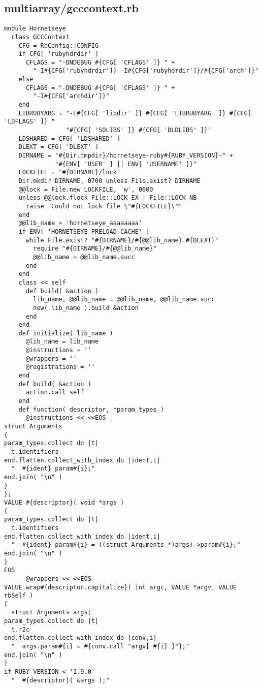\subsection{multiarray/gcccontext.rb}\label{cha:multiarray-gcccontext-rb}
\begin{lstlisting}
module Hornetseye
  class GCCContext
    CFG = RbConfig::CONFIG
    if CFG[ 'rubyhdrdir' ]
      CFLAGS = "-DNDEBUG #{CFG[ 'CFLAGS' ]} " +
        "-I#{CFG['rubyhdrdir']} -I#{CFG['rubyhdrdir']}/#{CFG['arch']}"
    else
      CFLAGS = "-DNDEBUG #{CFG[ 'CFLAGS' ]} " +
        "-I#{CFG['archdir']}"
    end
    LIBRUBYARG = "-L#{CFG[ 'libdir' ]} #{CFG[ 'LIBRUBYARG' ]} #{CFG[ 'LDFLAGS' ]} "
                 "#{CFG[ 'SOLIBS' ]} #{CFG[ 'DLDLIBS' ]}"
    LDSHARED = CFG[ 'LDSHARED' ]
    DLEXT = CFG[ 'DLEXT' ]
    DIRNAME = "#{Dir.tmpdir}/hornetseye-ruby#{RUBY_VERSION}-" +
              "#{ENV[ 'USER' ] || ENV[ 'USERNAME' ]}"
    LOCKFILE = "#{DIRNAME}/lock"
    Dir.mkdir DIRNAME, 0700 unless File.exist? DIRNAME
    @@lock = File.new LOCKFILE, 'w', 0600
    unless @@lock.flock File::LOCK_EX | File::LOCK_NB
      raise "Could not lock file \"#{LOCKFILE}\""
    end
    @@lib_name = 'hornetseye_aaaaaaaa'
    if ENV[ 'HORNETSEYE_PRELOAD_CACHE' ]
      while File.exist? "#{DIRNAME}/#{@@lib_name}.#{DLEXT}"
        require "#{DIRNAME}/#{@@lib_name}"        
        @@lib_name = @@lib_name.succ
      end
    end
    class << self
      def build( &action )
        lib_name, @@lib_name = @@lib_name, @@lib_name.succ
        new( lib_name ).build &action
      end
    end
    def initialize( lib_name )
      @lib_name = lib_name
      @instructions = ''
      @wrappers = ''
      @registrations = ''
    end
    def build( &action )
      action.call self
    end
    def function( descriptor, *param_types )
      @instructions << <<EOS
struct Arguments
{
param_types.collect do |t|
  t.identifiers
end.flatten.collect_with_index do |ident,i|
  "  #{ident} param#{i};"
end.join( "\n" )
}
};
VALUE #{descriptor}( void *args )
{
param_types.collect do |t|
  t.identifiers
end.flatten.collect_with_index do |ident,i|
  "  #{ident} param#{i} = ((struct Arguments *)args)->param#{i};"
end.join( "\n" )
}
EOS
      @wrappers << <<EOS
VALUE wrap#{descriptor.capitalize}( int argc, VALUE *argv, VALUE rbSelf )
{
  struct Arguments args;
param_types.collect do |t|
  t.r2c
end.flatten.collect_with_index do |conv,i|
  "  args.param#{i} = #{conv.call "argv[ #{i} ]"};"
end.join( "\n" )
}
if RUBY_VERSION < '1.9.0'
  "  #{descriptor}( &args );"

\end{lstlisting}
